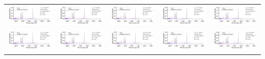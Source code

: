 \begin{center}
\begin{longtable}{l l l l l }
    \includegraphics[width=0.19\linewidth, clip]{model_160000_36.93_3.60.pdf} & \includegraphics[width=0.19\linewidth, clip]{model_130000_37.25_3.74.pdf} & \includegraphics[width=0.19\linewidth, clip]{model_140000_37.03_3.60.pdf} & \includegraphics[width=0.19\linewidth, clip]{model_150000_36.93_3.54.pdf} & \includegraphics[width=0.19\linewidth, clip]{model_160000_36.70_3.40.pdf} \\
    \includegraphics[width=0.19\linewidth, clip]{model_130000_37.12_3.60.pdf} & \includegraphics[width=0.19\linewidth, clip]{model_120000_37.32_3.74.pdf} & \includegraphics[width=0.19\linewidth, clip]{model_120000_37.27_3.70.pdf} & \includegraphics[width=0.19\linewidth, clip]{model_130000_37.32_3.78.pdf} & \includegraphics[width=0.19\linewidth, clip]{model_150000_37.19_3.78.pdf} \\

\end{longtable}
\end{center}
